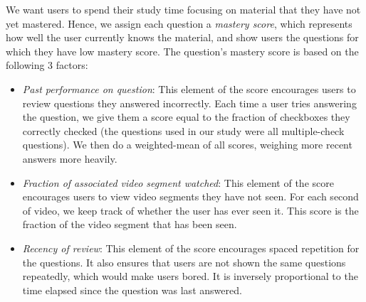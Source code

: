 \documentclass{sigchi}
\begin{document}
We want users to spend their study time focusing on material that they have not yet mastered. Hence, we assign each question a \emph{mastery score}, which represents how well the user currently knows the material, and show users the questions for which they have low mastery score. The question's mastery score is based on the following 3 factors:

\begin{itemize}
\item \emph{Past performance on question}: This element of the score encourages users to review questions they answered incorrectly. Each time a user tries answering the question, we give them a score equal to the fraction of checkboxes they correctly checked (the questions used in our study were all multiple-check questions). We then do a weighted-mean of all scores, weighing more recent answers more heavily. %
\item \emph{Fraction of associated video segment watched}: This element of the score encourages users to view video segments they have not seen. For each second of video, we keep track of whether the user has ever seen it. This score is the fraction of the video segment that has been seen. %
\item \emph{Recency of review}:  This element of the score encourages spaced repetition for the questions. It also ensures that users are not shown the same questions repeatedly, which would make users bored. It is inversely proportional to the time elapsed since the question was last answered. %
\end{itemize}


\end{document}
